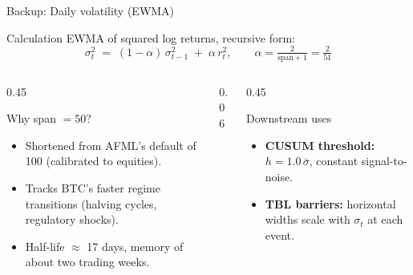 \documentclass[aspectratio=169, t]{beamer}
\begin{document}
\begin{frame}{Backup: Daily volatility (EWMA)}
\vspace{-1.2em}

\begin{block}{Calculation}
\centering
EWMA of squared log returns, recursive form:
\[
  \sigma_t^2 \;=\; (1-\alpha)\,\sigma_{t-1}^2 \;+\; \alpha\,r_t^2,
  \qquad \alpha = \tfrac{2}{\mathrm{span}+1} = \tfrac{2}{51}
\]
\end{block}

\vspace{0.3em}

\begin{columns}[T]
\begin{column}{0.45\textwidth}
{
\begin{block}{Why span $= 50$?}
\footnotesize
\begin{itemize}
  \item Shortened from AFML's default of 100 (calibrated to equities).
  \item Tracks BTC's faster regime transitions (halving cycles, regulatory shocks).
  \item Half-life $\approx$ 17 days, memory of about two trading weeks.
\end{itemize}
\end{block}
}
\end{column}
\begin{column}{0.06\textwidth}\hfill\end{column}
\begin{column}{0.45\textwidth}
{
\begin{block}{Downstream uses}
\footnotesize
\begin{itemize}
  \item \textbf{CUSUM threshold:} $h = 1.0\,\bar{\sigma}$, constant signal-to-noise.
  \item \textbf{TBL barriers:} horizontal widths scale with $\sigma_t$ at each event.
\end{itemize}
\end{block}
}
\end{column}
\end{columns}
\end{frame}
\end{document}
